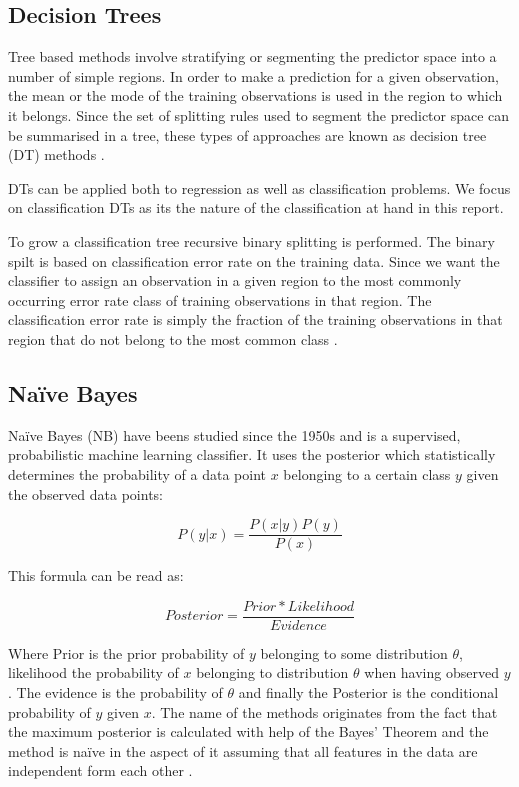 \subsection{Decision Trees}

Tree based methods involve stratifying or segmenting the predictor space into a number of simple regions. In order to make a prediction for a given observation, the mean or the mode of the training observations is used in the region to which it belongs. Since the set of splitting rules used
to segment the predictor space can be summarised in a tree, these types of approaches are known as decision tree (DT) methods \parencite{James:2014}.

DTs can be applied both to regression as well as classification problems. We focus on classification DTs as its the nature of the classification at hand in this report.

To grow a classification tree recursive
binary splitting is performed. The binary spilt is based on classification error rate on the training data. Since we want the classifier to assign an observation in a given region to the most commonly occurring error rate class of training observations in that region. The classification error rate is simply the fraction of the training observations in that region that do not belong to the most common class \parencite{James:2014}.

\subsection{Naïve Bayes}

Naïve Bayes (NB) have beens studied since the 1950s and is a supervised, probabilistic machine learning classifier. It uses the  posterior which statistically determines the probability of a data point $x$ belonging to a certain class $y$ given the observed data points:

\[
P(y|x) = \frac{P(x|y)P(y)}{P(x)}
\]

This formula can be read as:

\[
Posterior = \frac{Prior * Likelihood}{Evidence}
\]

Where Prior is the prior probability of $y$ belonging to some distribution $\theta$, likelihood the probability of $x$ belonging to distribution $\theta$ when having observed $y$. The evidence is the probability of $\theta$ and finally the Posterior is the conditional probability of $y$ given $x$. The name of the methods originates from the fact that the maximum posterior is calculated with help of the Bayes' Theorem and the method is naïve in the aspect of it assuming that all features in the data are independent form each other \parencite{george2012}.


